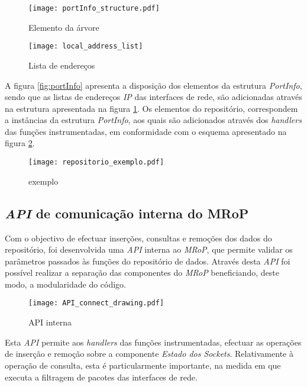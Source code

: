 \begin{figure}[ht]
\begin{minipage}[b]{0.5\linewidth}
\centering
\texttt{[image: portInfo\_structure.pdf]}
\caption{Elemento da árvore}
\label{fig:portInfo}
\end{minipage}
\hspace{0.5cm}
\begin{minipage}[b]{0.5\linewidth}
\centering
\texttt{[image: local\_address\_list]}
\caption{Lista de endereços}
\label{fig:local_address_list}
\end{minipage}
\end{figure}

A figura \ref{fig:portInfo} apresenta a disposição dos elementos da estrutura \textit{PortInfo}, sendo que as listas de endereços \textit{IP} das interfaces de rede, são adicionadas através na estrutura apresentada na figura \ref{fig:local_address_list}.
Os elementos do repositório, correspondem a instâncias da estrutura \textit{PortInfo}, aos quais são adicionados através dos \textit{handlers} das funções instrumentadas, em conformidade com o esquema apresentado na figura \ref{fig:repo_example}.

\begin{figure}[ht]
\centering
\texttt{[image: repositorio\_exemplo.pdf]}
\caption{exemplo}
\label{fig:repo_example}
\end{figure}

\subsection{\textit{API} de comunicação interna do MRoP}
\label{sub:repo_api}

Com o objectivo de efectuar inserções, consultas e remoções dos dados do repositório, foi desenvolvida uma \textit{API} interna ao \textit{MRoP}, que permite validar os parâmetros passados às funções do repositório de dados.
Através desta \textit{API} foi possível realizar a separação das componentes do \textit{MRoP} beneficiando, deste modo, a modularidade do código.

\begin{figure}[ht]
\centering
\texttt{[image: API\_connect\_drawing.pdf]}
\caption{API interna}
\label{fig:api_connect}
\end{figure}

Esta \textit{API} permite aos \textit{handlers} das funções instrumentadas, efectuar as operações de inserção e remoção sobre a componente \textit{Estado dos Sockets}.
Relativamente à operação de consulta, esta é particularmente importante, na medida em que executa a filtragem de pacotes das interfaces de rede.

